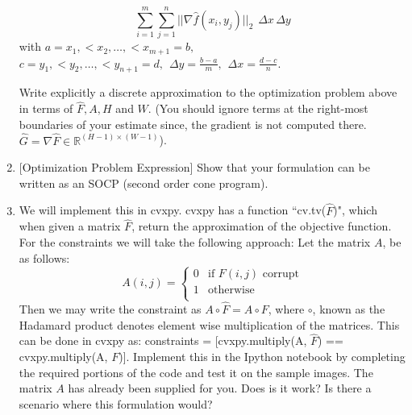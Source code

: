 \begin{enumerate}
     \begin{equation*}
        \sum_{i=1}^{m} \sum_{j=1}^{n} ||\nabla \hat{f}(x_{i},y_{j})||_2 \hspace{5pt}  \Delta x \hspace{2pt} \Delta y
    \end{equation*} 
    with $a=x_{1}, < x_{2}, \hdots, < x_{m+1} = b, \hspace{5pt}$
    $c=y_{1}, < y_{2}, \hdots, < y_{n+1} = d, \hspace{5pt} \Delta y = \frac{b-a}{m}, \hspace{5pt} \Delta x = \frac{d-c}{n}$.
    
    Write explicitly a discrete approximation to the optimization problem above in terms of $\hat{F},A, H$ and $W$. (You should ignore terms at the right-most boundaries of your estimate since, the gradient is not computed there. $\hat{G} = \nabla \hat{F} \in \mathbb{R}^{(H-1) \times (W-1)}$).
    
    
    \sol{}
    
    \item {[Optimization Problem Expression]}
    Show that your formulation can be written as an SOCP (second order cone program).
    \newline
    
    \sol{}
    
    \item 
    We will implement this in cvxpy.  cvxpy has a function ``cv.tv($\hat{F}$)", which when given a matrix $\hat{F}$, return the approximation of the objective function. 
    \newline
    \newline
    For the constraints we will take the following approach:
    Let the matrix $A$, be as follows:
    \begin{equation*}
        A(i,j) = 
        \begin{cases}
          0 & \text{if } F(i,j) \text{ corrupt}\\
          1 & \text{otherwise}\\
        \end{cases} 
    \end{equation*}
    Then we may write the constraint as $A \circ \hat{F} = A \circ F$, where $\circ$, known as the Hadamard product denotes element wise multiplication of the matrices. 
    \newline
    \newline
    This can be done in cvxpy as:
    \newline
    \newline
    constraints = [cvxpy.multiply(A, $\hat{F}$) == cvxpy.multiply(A, $F$)].
    \newline
    \newline
    Implement this in the Ipython notebook by completing the required portions of the code and test it on the sample images. The matrix $A$ has already been supplied for you. Does is it work? Is there a scenario where this formulation would?
    \newline
    \sol{}
\end{enumerate}